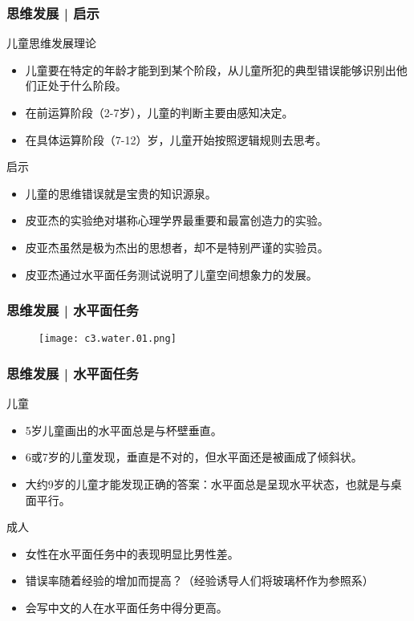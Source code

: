 \begin{frame}
  \frametitle{思维发展 | 启示}
  \begin{block}{儿童思维发展理论}
    \begin{itemize}
      \item 儿童要在特定的年龄才能到到某个阶段，从儿童所犯的典型错误能够识别出他们正处于什么阶段。
      \item 在前运算阶段（2-7岁），儿童的判断主要由感知决定。
      \item 在具体运算阶段（7-12）岁，儿童开始按照逻辑规则去思考。
    \end{itemize}
  \end{block}
  \pause
  \begin{block}{启示}
    \begin{itemize}
      \item 儿童的思维错误就是宝贵的知识源泉。
      \item 皮亚杰的实验绝对堪称心理学界最重要和最富创造力的实验。
      \item 皮亚杰虽然是极为杰出的思想者，却不是特别严谨的实验员。
      \item 皮亚杰通过水平面任务测试说明了儿童空间想象力的发展。
    \end{itemize}
  \end{block}
\end{frame}

\begin{frame}
  \frametitle{思维发展 | 水平面任务}
  \begin{figure}
    \centering
    \texttt{[image: c3.water.01.png]}
  \end{figure}
\end{frame}

\begin{frame}
  \frametitle{思维发展 | 水平面任务}
  \begin{block}{儿童}
    \begin{itemize}
      \item 5岁儿童画出的水平面总是与杯壁垂直。
      \item 6或7岁的儿童发现，垂直是不对的，但水平面还是被画成了倾斜状。
      \item 大约9岁的儿童才能发现正确的答案：水平面总是呈现水平状态，也就是与桌面平行。
    \end{itemize}
  \end{block}
  \pause
  \begin{block}{成人}
    \begin{itemize}
      \item 女性在水平面任务中的表现明显比男性差。
      \item 错误率随着经验的增加而提高？（经验诱导人们将玻璃杯作为参照系）
      \item 会写中文的人在水平面任务中得分更高。
    \end{itemize}
  \end{block}
\end{frame}

